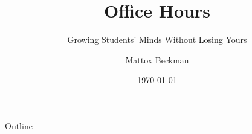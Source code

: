 \documentclass[aspectration=169,xcolor={x11names},presentation]{beamer}
\author{Mattox Beckman}
\date{\today}
\title{Office Hours}
\subtitle{Growing Students' Minds Without Losing Yours}
\begin{document}
\maketitle
\begin{frame}{Outline}
\tableofcontents
\end{frame}
\end{document}
